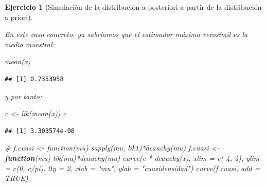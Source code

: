 \documentclass[
]{book}
\newenvironment{Shaded}{\begin{snugshade}}{\end{snugshade}}
\newcommand{\AttributeTok}[1]{\textcolor[rgb]{0.77,0.63,0.00}{#1}}
\newcommand{\CommentTok}[1]{\textcolor[rgb]{0.56,0.35,0.01}{\textit{#1}}}
\newcommand{\ConstantTok}[1]{\textcolor[rgb]{0.00,0.00,0.00}{#1}}
\newcommand{\ControlFlowTok}[1]{\textcolor[rgb]{0.13,0.29,0.53}{\textbf{#1}}}
\newcommand{\DecValTok}[1]{\textcolor[rgb]{0.00,0.00,0.81}{#1}}
\newcommand{\FunctionTok}[1]{\textcolor[rgb]{0.00,0.00,0.00}{#1}}
\newcommand{\NormalTok}[1]{#1}
\newcommand{\OtherTok}[1]{\textcolor[rgb]{0.56,0.35,0.01}{#1}}
\newcommand{\SpecialCharTok}[1]{\textcolor[rgb]{0.00,0.00,0.00}{#1}}
\newcommand{\StringTok}[1]{\textcolor[rgb]{0.31,0.60,0.02}{#1}}
\theoremstyle{break}
\newtheorem{exercise}{Ejercicio}[chapter]
\theoremstyle{nonumberplain}
\begin{document}
\begin{exercise}[Simulación de la distribución a posteriori a partir de la distribución a priori]
\begin{enumerate}
\begin{Shaded}
\end{Shaded}

  En este caso concreto, ya sabríamos que el estimador máximo verosímil es la media muestral:

\begin{Shaded}
\begin{Highlighting}[]
\FunctionTok{mean}\NormalTok{(x)}
\end{Highlighting}
\end{Shaded}

\begin{verbatim}
## [1] 0.7353958
\end{verbatim}

  y por tanto:

\begin{Shaded}
\begin{Highlighting}[]
\NormalTok{c }\OtherTok{\textless{}{-}} \FunctionTok{lik}\NormalTok{(}\FunctionTok{mean}\NormalTok{(x))}
\NormalTok{c   }
\end{Highlighting}
\end{Shaded}

\begin{verbatim}
## [1] 3.303574e-08
\end{verbatim}

\begin{Shaded}
\begin{Highlighting}[]
\CommentTok{\# f.cuasi \textless{}{-} function(mu) sapply(mu, lik1)*dcauchy(mu)}
\NormalTok{f.cuasi }\OtherTok{\textless{}{-}} \ControlFlowTok{function}\NormalTok{(mu) }\FunctionTok{lik}\NormalTok{(mu)}\SpecialCharTok{*}\FunctionTok{dcauchy}\NormalTok{(mu)    }
\FunctionTok{curve}\NormalTok{(c }\SpecialCharTok{*} \FunctionTok{dcauchy}\NormalTok{(x), }\AttributeTok{xlim =} \FunctionTok{c}\NormalTok{(}\SpecialCharTok{{-}}\DecValTok{4}\NormalTok{, }\DecValTok{4}\NormalTok{), }\AttributeTok{ylim =} \FunctionTok{c}\NormalTok{(}\DecValTok{0}\NormalTok{, c}\SpecialCharTok{/}\NormalTok{pi), }\AttributeTok{lty =} \DecValTok{2}\NormalTok{,}
      \AttributeTok{xlab =} \StringTok{"mu"}\NormalTok{, }\AttributeTok{ylab =} \StringTok{"cuasidensidad"}\NormalTok{)}
\FunctionTok{curve}\NormalTok{(f.cuasi, }\AttributeTok{add =} \ConstantTok{TRUE}\NormalTok{)}
\end{Highlighting}
\end{Shaded}


\end{enumerate}
\end{exercise}
\end{document}
